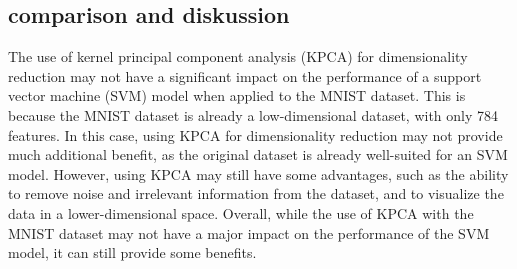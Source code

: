 \subsection*{comparison and diskussion}

The use of kernel principal component analysis (KPCA) for dimensionality reduction may not have a significant impact on the performance of a support vector machine (SVM) model when applied to the MNIST dataset. This is because the MNIST dataset is already a low-dimensional dataset, with only 784 features. In this case, using KPCA for dimensionality reduction may not provide much additional benefit, as the original dataset is already well-suited for an SVM model. However, using KPCA may still have some advantages, such as the ability to remove noise and irrelevant information from the dataset, and to visualize the data in a lower-dimensional space. Overall, while the use of KPCA with the MNIST dataset may not have a major impact on the performance of the SVM model, it can still provide some benefits.
